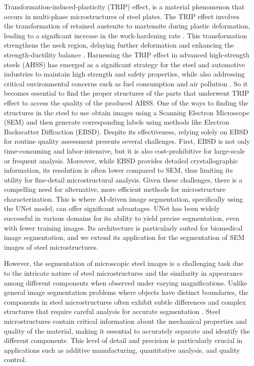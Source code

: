 \documentclass[]{article}
\begin{document}
Transformation-induced-plasticity (TRIP) effect, is a material phenomenon that occurs in multi-phase microstructures of steel plates. The TRIP effect involves the transformation of retained austenite to martensite during plastic deformation, leading to a significant increase in the work-hardening rate \cite{tripSteels}. This transformation strengthens the neck region, delaying further deformation and enhancing the strength-ductility balance \cite{ALLAIN2004158}. Harnessing the TRIP effect in advanced high-strength steels (AHSS) has emerged as a significant strategy for the steel and automotive industries to maintain high strength and safety properties, while also addressing critical environmental concerns such as fuel consumption and air pollution \cite{BOUAZIZ2011141}. So it becomes essential to find the proper structures of the parts that underwent TRIP effect to access the quality of the produced AHSS. One of the ways to finding the structures in the steel to use obtain images using a Scanning Electron Microscope (SEM) and then generate corresponding labels using methods like Electron Backscatter Diffraction (EBSD). Despite its effectiveness, relying solely on EBSD for routine quality assessment presents several challenges. First, EBSD is not only time-consuming and labor-intensive, but it is also cost-prohibitive for large-scale or frequent analysis. Moreover, while EBSD provides detailed crystallographic information, its resolution is often lower compared to SEM, thus limiting its utility for fine-detail microstructural analysis. Given these challenges, there is a compelling need for alternative, more efficient methods for microstructure characterization. This is where AI-driven image segmentation, specifically using the UNet model, can offer significant advantages. UNet has been widely successful in various domains for its ability to yield precise segmentation, even with fewer training images. Its architecture is particularly suited for biomedical image segmentation, and we extend its application for the segmentation of SEM images of steel microstructures.

However, the segmentation of microscopic steel images is a challenging task due to the intricate nature of steel microstructures and the similarity in appearance among different components when observed under varying magnifications. Unlike general image segmentation problems where objects have distinct boundaries, the components in steel microstructures often exhibit subtle differences and complex structures that require careful analysis for accurate segmentation \cite{NIPS2012_imagenet}. Steel microstructures contain critical information about the mechanical properties and quality of the material, making it essential to accurately separate and identify the different components. This level of detail and precision is particularly crucial in applications such as additive manufacturing, quantitative analysis, and quality control.
\end{document}
